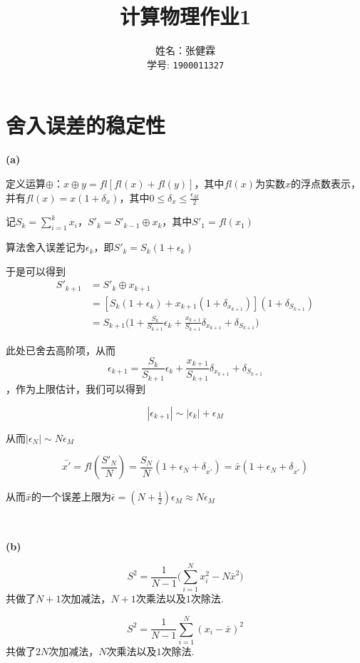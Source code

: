 \documentclass[UTF8]{ctexart}
\begin{document}
\title{计算物理作业1}
\author{姓名：张健霖\\学号: \texttt{1900011327}}
\maketitle

\section{舍入误差的稳定性}

\noindent\textbf{(a)}

定义运算$\oplus$：$x\oplus y=fl[fl(x)+fl(y)]$，其中$fl(x)$为实数$x$的浮点数表示，并有$fl(x)=x(1+\delta_x)$，其中$0\leq\delta_x\leq\frac{\epsilon_M}{2}$

记$S_k=\sum_{i=1}^k x_i$，$S'_k=S'_{k-1}\oplus x_{k}$，其中$S'_1=fl(x_1)$

算法舍入误差记为$\epsilon_k$，即$S'_k=S_k(1+\epsilon_k)$

于是可以得到
$$
\begin{aligned}
S'_{k+1}&=S'_{k}\oplus x_{k+1}\\
&=[S_k(1+\epsilon_k)+x_{k+1}(1+\delta_{x_{k+1}})](1+\delta_{S_{k+1}})\\
&=S_{k+1}\Big(1+\frac{S_k}{S_{k+1}}\epsilon_k+\frac{x_{k+1}}{S_{k+1}}\delta_{x_{k+1}}+\delta_{S_{k+1}}\Big)
\end{aligned}
$$

此处已舍去高阶项，从而
$$\epsilon_{k+1}=\frac{S_k}{S_{k+1}}\epsilon_k+\frac{x_{k+1}}{S_{k+1}}\delta_{x_{k+1}}+\delta_{S_{k+1}}$$，作为上限估计，我们可以得到

$$|\epsilon_{k+1}|\sim |\epsilon_k|+\epsilon_{M}$$

从而$|\epsilon_N|\sim N\epsilon_M$

$$\bar{x'}=fl(\frac{S'_N}{N})=\frac{S_N}{N}(1+\epsilon_N+\delta_{\bar{x'}})=\bar{x}(1+\epsilon_N+\delta_{\bar{x'}})$$

从而$\bar{x}$的一个误差上限为$\bar{\epsilon}=(N+\frac{1}{2})\epsilon_M\approx N\epsilon_M$

~\

\noindent\textbf{(b)}

\begin{equation}\label{1-b-1}
S^2=\frac{1}{N-1}\Big(\sum_{i=1}^N x_i^2-N\bar{x}^2\Big)
\end{equation}
共做了$N+1$次加减法，$N+1$次乘法以及$1$次除法.

\begin{equation}\label{1-b-2}
S^2=\frac{1}{N-1}\sum_{i=1}^N (x_i-\bar{x})^2
\end{equation}
共做了$2N$次加减法，$N$次乘法以及$1$次除法.
\end{document}
